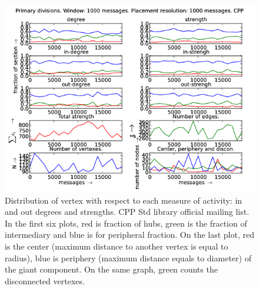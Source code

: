 \documentclass[%
 aip,
 jmp,%
 amsmath,amssymb,
 reprint,%
]{revtex4-1}
\begin{document}
\begin{figure}[hbtp] 
   \centering
        \includegraphics[width=\textwidth]{figs/CPP/1000}
    \caption{Distribution of vertex with respect to each measure of activity: in and out degrees and strengths. CPP Std library official mailing list. In the first six plots, red is fraction of hubs, green is the fraction of intermediary and blue is for peripheral fraction. On the last plot, red is the center (maximum distance to another vertex is equal to radius), blue is periphery (maximum distance equals to diameter) of the giant component. On the same graph, green counts the disconnected vertexes.}
    \label{fig:cpp1000}
\end{figure}
\end{document}

